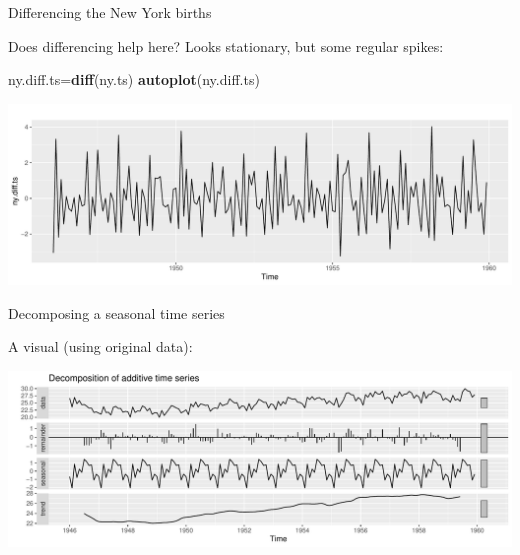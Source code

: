 \documentclass[
  ignorenonframetext,
]{beamer}
\newenvironment{Shaded}{\begin{snugshade}}{\end{snugshade}}
\newcommand{\KeywordTok}[1]{\textcolor[rgb]{0.13,0.29,0.53}{\textbf{#1}}}
\newcommand{\NormalTok}[1]{#1}
\newcommand{\OperatorTok}[1]{\textcolor[rgb]{0.81,0.36,0.00}{\textbf{#1}}}
\newcommand{\StringTok}[1]{\textcolor[rgb]{0.31,0.60,0.02}{#1}}
\begin{document}
\begin{frame}[fragile]{Differencing the New York births}
\protect\hypertarget{differencing-the-new-york-births}{}

Does differencing help here? Looks stationary, but some regular spikes:

\begin{Shaded}
\begin{Highlighting}[]
\NormalTok{ny.diff.ts=}\KeywordTok{diff}\NormalTok{(ny.ts)}
\KeywordTok{autoplot}\NormalTok{(ny.diff.ts)}
\end{Highlighting}
\end{Shaded}

\includegraphics{slides_d29_files/figure-beamer/unnamed-chunk-528-1.pdf}

\end{frame}

\begin{frame}[fragile]{Decomposing a seasonal time series}
\protect\hypertarget{decomposing-a-seasonal-time-series}{}

A visual (using original data):

\begin{Shaded}
\end{Shaded}

\includegraphics{slides_d29_files/figure-beamer/unnamed-chunk-529-1.pdf}

\end{frame}
\end{document}
